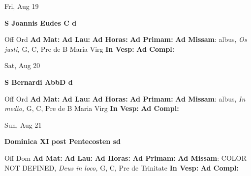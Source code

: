\documentclass[10pt]{memoir}
\begin{document}
\begin{center}
\begin{minipage}{3.5in}
\vspace{2em}
\begin{center}Fri, Aug 19
\end{center}
\textbf{ \large S Joannis Eudes C
\textnormal{\normalsize d}}

\begin{justify}Off Ord
\textbf{Ad Mat: }
\textbf{Ad Lau: }
\textbf{Ad Horas: }
\textbf{Ad Primam: }\textbf{Ad Missam}: albus, \textit{Os justi,} G, C, Pre de B Maria Virg
\textbf{In Vesp: }
\textbf{Ad Compl: }
\end{justify}
\end{minipage}
\end{center}

\begin{center}
\begin{minipage}{3.5in}
\vspace{2em}
\begin{center}Sat, Aug 20
\end{center}
\textbf{ \large S Bernardi AbbD
\textnormal{\normalsize d}}

\begin{justify}Off Ord
\textbf{Ad Mat: }
\textbf{Ad Lau: }
\textbf{Ad Horas: }
\textbf{Ad Primam: }\textbf{Ad Missam}: albus, \textit{In medio,} G, C, Pre de B Maria Virg
\textbf{In Vesp: }
\textbf{Ad Compl: }
\end{justify}
\end{minipage}
\end{center}

\begin{center}
\begin{minipage}{3.5in}
\vspace{2em}
\begin{center}Sun, Aug 21
\end{center}
\textbf{ \large Dominica XI post Pentecosten
\textnormal{\normalsize sd}}

\begin{justify}Off Dom
\textbf{Ad Mat: }
\textbf{Ad Lau: }
\textbf{Ad Horas: }
\textbf{Ad Primam: }\textbf{Ad Missam}: COLOR NOT DEFINED, \textit{Deus in loco,} G, C, Pre de Trinitate
\textbf{In Vesp: }
\textbf{Ad Compl: }
\end{justify}
\end{minipage}
\end{center}
\end{document}
